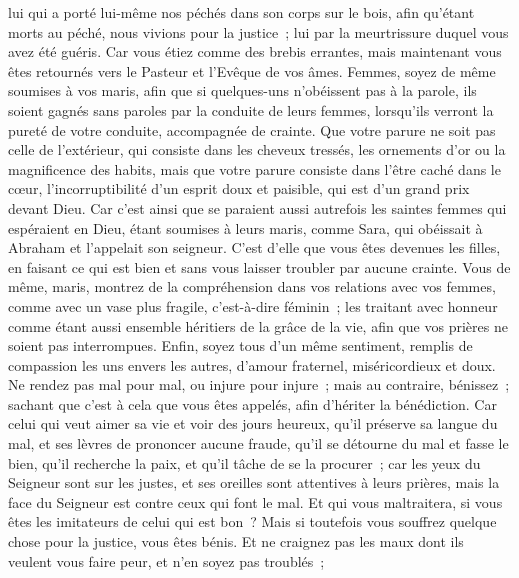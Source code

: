 \begin{multicols}{2}
lui qui a porté lui-même nos péchés dans son corps sur le bois, afin qu'étant morts au péché, nous vivions pour la justice~; lui par la meurtrissure duquel vous avez été guéris.
Car vous étiez comme des brebis errantes, mais maintenant vous êtes retournés vers le Pasteur et l'Evêque de vos âmes.
\VerseOne{}Femmes, soyez de même soumises à vos maris, afin que si quelques-uns n'obéissent pas à la parole, ils soient gagnés sans paroles par la conduite de leurs femmes,
lorsqu'ils verront la pureté de votre conduite, accompagnée de crainte.
Que votre parure ne soit pas celle de l'extérieur, qui consiste dans les cheveux tressés, les ornements d'or ou la magnificence des habits,
mais que votre parure consiste dans l'être caché dans le cœur, l'incorruptibilité d'un esprit doux et paisible, qui est d'un grand prix devant Dieu.
Car c'est ainsi que se paraient aussi autrefois les saintes femmes qui espéraient en Dieu, étant soumises à leurs maris,
comme Sara, qui obéissait à Abraham et l'appelait son seigneur. C'est d'elle que vous êtes devenues les filles, en faisant ce qui est bien et sans vous laisser troubler par aucune crainte.
Vous de même, maris, montrez de la compréhension dans vos relations avec vos femmes, comme avec un vase plus fragile, c'est-à-dire féminin~; les traitant avec honneur comme étant aussi ensemble héritiers de la grâce de la vie, afin que vos prières ne soient pas interrompues.
Enfin, soyez tous d'un même sentiment, remplis de compassion les uns envers les autres, d'amour fraternel, miséricordieux et doux.
Ne rendez pas mal pour mal, ou injure pour injure~; mais au contraire, bénissez~; sachant que c'est à cela que vous êtes appelés, afin d'hériter la bénédiction.
Car celui qui veut aimer sa vie et voir des jours heureux, qu'il préserve sa langue du mal, et ses lèvres de prononcer aucune fraude,
qu'il se détourne du mal et fasse le bien, qu'il recherche la paix, et qu'il tâche de se la procurer~;
car les yeux du Seigneur sont sur les justes, et ses oreilles sont attentives à leurs prières, mais la face du Seigneur est contre ceux qui font le mal.
Et qui vous maltraitera, si vous êtes les imitateurs de celui qui est bon~?
Mais si toutefois vous souffrez quelque chose pour la justice, vous êtes bénis. Et ne craignez pas les maux dont ils veulent vous faire peur, et n'en soyez pas troublés~;

\end{multicols}
